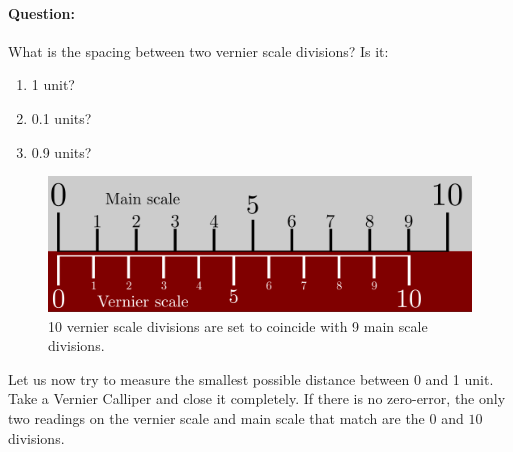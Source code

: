 \begin{question}
    \paragraph{Question:} What is the spacing between two vernier scale divisions? Is it:
    \begin{enumerate}
        \item 1 unit?
        \item 0.1 units?
        \item 0.9 units?
    \end{enumerate}
\end{question}



\begin{figure}[!htb]
    \centering
    \includegraphics[scale=0.75]{figs/vernier1.png}
    \caption{10 vernier scale divisions are set to coincide with 9 main scale divisions.}
    \label{fig:vernier_1}
\end{figure}

Let us now try to measure the smallest possible distance between 0 and 1 unit. Take a Vernier Calliper and close it completely. If there is no zero-error, the only two readings on the vernier scale and main scale that match are the $0$ and $10$ divisions.

